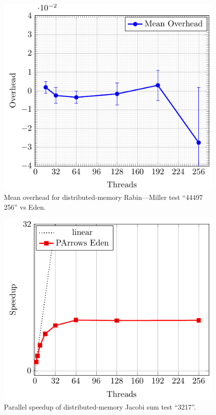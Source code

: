 \documentclass[paper=A4,twoside=true,openright,parskip=full,chapterprefix=true,headings=normal,bibliography=totoc,listof=totoc,titlepage=on,captions=tableabove,draft=false,british]{scrreprt}%
\renewcommand{\enquote}[1]{{``}#1{''}}
\begin{document}
\begin{figure}
\centering
\includegraphics{src/img/overDistRM256Eden.pdf}
\caption{Mean overhead for distributed-memory Rabin---Miller test
\enquote{44497 256} vs Eden.\label{fig:overDistRM256Eden}}
\end{figure}

\begin{figure}
\centering
\includegraphics{src/img/perfDistJacobi.pdf}
\caption{Parallel speedup of distributed-memory Jacobi sum test
\enquote{3217}.\label{fig:perfDistJacobi}}
\end{figure}
\end{document}
